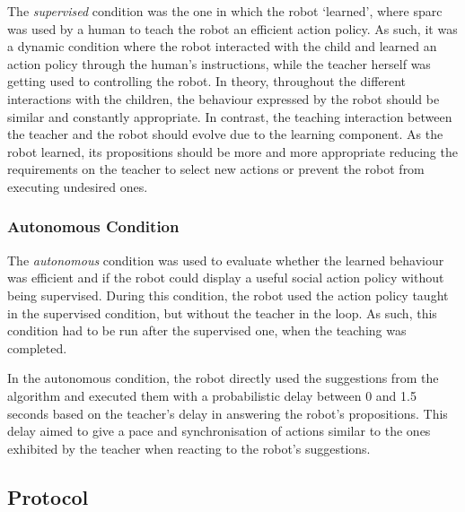 The \textit{supervised} condition was the one in which the robot `learned', where \gls{sparc} was used by a human to teach the robot an efficient action policy. As such, it was a dynamic condition where the robot interacted with the child and learned an action policy through the human's instructions, while the teacher herself was getting used to controlling the robot. In theory, throughout the different interactions with the children, the behaviour expressed by the robot should be similar and constantly appropriate. In contrast, the teaching interaction between the teacher and the robot should evolve due to the learning component. As the robot learned, its propositions should be more and more appropriate reducing the requirements on the teacher to select new actions or prevent the  robot from executing undesired ones.

\subsubsection{Autonomous Condition}

The \textit{autonomous} condition was used to evaluate whether the learned behaviour was efficient and if the robot could display a useful social action policy without being supervised. During this condition, the robot used the action policy taught in the supervised condition, but without the teacher in the loop. As such, this condition had to be run after the supervised one, when the teaching was completed. %

In the autonomous condition, the robot directly used the suggestions from the algorithm and executed them with a probabilistic delay between 0 and 1.5 seconds based on the teacher's delay in answering the robot's propositions. This delay aimed to give a pace and synchronisation of actions similar to the ones exhibited by the teacher when reacting to the robot's suggestions.

\subsection{Protocol}

